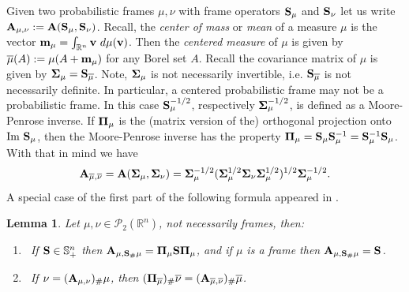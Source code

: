 \documentclass{amsart}
\numberwithin{equation}{section}
\newcommand\cP{{\mathcal P}}
\newcommand\bS{{\bf S}}
\newcommand\R{{\mathbb R}}
\newcommand\im{{\operatorname{Im}}}
\theoremstyle{plain}
\newtheorem{lemma}[subsection]{Lemma}
\theoremstyle{definition}
\begin{document}
Given two probabilistic frames $\mu, \nu$ with frame operators  ${\bf S}_{\mu}$ and ${\bf S}_{\nu}$ 
let us write $ {\bf A}_{\mu, \nu} := {\bf A}({\bf S}_{\mu}, {\bf S}_{\nu})$. 
Recall, the {\em center of mass} or {\em mean} of a measure $\mu$ is the vector  
${\bf m}_{\mu}=\int_{\R^n} {\bf v}\  d\mu({\bf v})$. Then the {\em centered measure} of $\mu$ is given by 
$\overline{\mu}(A):=\mu(A+{\bf m}_{\mu})$ for any Borel set $A$.
Recall the covariance matrix of $\mu$ is given by ${\bf \Sigma}_{\mu}=\bS_{\overline{\mu}}$. Note, ${\bf \Sigma}_{\mu}$ is not necessarily invertible, i.e. $\bS_{\overline{\mu}}$ is not necessarily definite. 
In particular, a centered probabilistic frame may not be a probabilistic frame. In this case  ${\bf \bS}_{\mu}^{-1/2}$, respectively 
${\bf \Sigma}_{\mu}^{-1/2}$, is defined as a Moore-Penrose inverse. 
If ${\bf \Pi}_{\mu}$ is the (matrix version of the) orthogonal projection onto $\im\ \bS_{\mu}$, then the Moore-Penrose inverse has the property  $ {\bf \Pi}_{\mu}=\bS_{\mu}\bS^{-1}_{\mu}=\bS^{-1}_{\mu}\bS_{\mu}$. With that in mind we have $$ {\bf A}_{\overline{\mu},\overline{\nu}} = {\bf A}({\bf \Sigma}_{\mu}, {\bf \Sigma}_{\nu})= {\bf \Sigma}_{\mu}^{-1/2}({\bf \Sigma}_{\mu}^{1/2}{\bf \Sigma}_{\nu}{\bf \Sigma}_{\mu}^{1/2})^{1/2}{\bf \Sigma}_{\mu}^{-1/2}.$$ 
A special case of the first part of the following formula appeared in \cite{loukili2020minimization}. 
\begin{lemma}\label{Lemma:A_properties}
Let $\mu, \nu \in \cP_2(\R^n)$, not necessarily frames, then: 
\begin{enumerate}
    \item\   If $ \bS \in {\mathbb S}^n_{+}$ then ${\bf A}_{\mu, {\bf S}_{\#}\mu} = {\bf \Pi}_{\mu}{\bf S}{\bf \Pi}_{\mu}$, 
    and if $\mu$ is a frame then ${\bf A}_{\mu, {\bf S}_{\#}\mu} = \bS$. \label{lemma:push} 
    \vspace{1mm}
    \item\  If $\nu=({\bf A}_{\mu, \nu})_{\#}\mu$, then $({\bf \Pi}_{\overline{\mu}})_{\#}\overline{\nu}=({\bf A}_{\overline{\mu}, \overline{\nu}})_{\#}\overline{\mu}$. \label{lemma:cent_opt_cond}
\end{enumerate}
\end{lemma}
\end{document}
